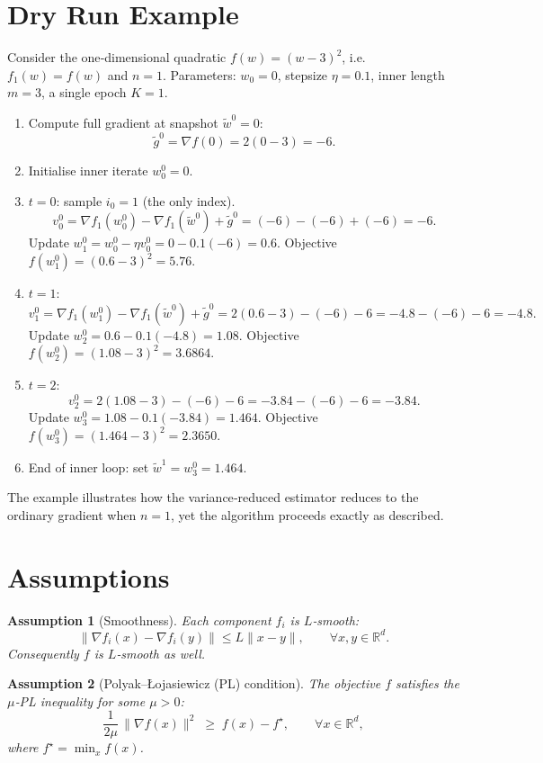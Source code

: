 \documentclass{article}
\newtheorem{assumption}{Assumption}
\begin{document}
\section*{Dry Run Example}
Consider the one‑dimensional quadratic $f(w)=(w-3)^{2}$, i.e.
$f_1(w)=f(w)$ and $n=1$.  
Parameters: $w_{0}=0$, stepsize $\eta=0.1$, inner length $m=3$, a single epoch $K=1$.

\begin{enumerate}[label=Step \arabic*:, leftmargin=*]
\item Compute full gradient at snapshot $\tilde{w}^{0}=0$:
\[
\tilde{g}^{0}= \nabla f(0)=2(0-3)=-6 .
\]
\item Initialise inner iterate $w_{0}^{0}=0$.
\item $t=0$: sample $i_{0}=1$ (the only index).  
\[
v_{0}^{0}= \nabla f_{1}(w_{0}^{0})-\nabla f_{1}(\tilde{w}^{0})+\tilde{g}^{0}
= (-6)-(-6)+(-6)=-6 .
\]
Update $w_{1}^{0}=w_{0}^{0}-\eta v_{0}^{0}=0-0.1(-6)=0.6$.
Objective $f(w_{1}^{0})=(0.6-3)^{2}=5.76$.

\item $t=1$:  
\[
v_{1}^{0}= \nabla f_{1}(w_{1}^{0})-\nabla f_{1}(\tilde{w}^{0})+\tilde{g}^{0}
=2(0.6-3)-(-6)-6 = -4.8-(-6)-6 = -4.8 .
\]
Update $w_{2}^{0}=0.6-0.1(-4.8)=1.08$.
Objective $f(w_{2}^{0})=(1.08-3)^{2}=3.6864$.

\item $t=2$:  
\[
v_{2}^{0}=2(1.08-3)-(-6)-6 = -3.84-(-6)-6 = -3.84 .
\]
Update $w_{3}^{0}=1.08-0.1(-3.84)=1.464$.
Objective $f(w_{3}^{0})=(1.464-3)^{2}=2.3650$.

\item End of inner loop: set $\tilde{w}^{1}=w_{3}^{0}=1.464$.
\end{enumerate}

The example illustrates how the variance‑reduced estimator reduces to the ordinary gradient
when $n=1$, yet the algorithm proceeds exactly as described.

\newpage
\section*{Assumptions}
\begin{assumption}[Smoothness]\label{ass:smooth}
Each component $f_i$ is $L$‑smooth:
\[
\|\nabla f_i(x)-\nabla f_i(y)\|\le L\|x-y\|,\qquad \forall x,y\in\mathbb{R}^{d}.
\]
Consequently $f$ is $L$‑smooth as well.
\end{assumption}

\begin{assumption}[Polyak–Łojasiewicz (PL) condition]\label{ass:pl}
The objective $f$ satisfies the $\mu$‑PL inequality for some $\mu>0$:
\[
\frac{1}{2\mu}\,\|\nabla f(x)\|^{2}\;\ge\; f(x)-f^{\star},
\qquad \forall x\in\mathbb{R}^{d},
\]
where $f^{\star}= \min_{x}f(x)$.
\end{assumption}
\end{document}

